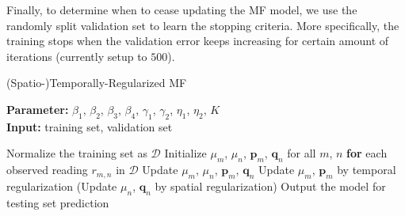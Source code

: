 Finally, to determine when to cease updating the MF model, we use the randomly split validation set to learn the stopping criteria. More specifically, the training stops when the validation error keeps increasing for certain amount of iterations (currently setup to $500$). 

\begin{algorithm}
	\caption{(Spatio-)Temporally-Regularized MF}
	\label{alg:STRMF}
	\textbf{Parameter:} $\beta_1$, $\beta_2$, $\beta_3$, $\beta_4$, $\gamma_1$, $\gamma_2$, $\eta_1$, $\eta_2$, $K$\\
	\textbf{Input:} training set, validation set
	\begin{algorithmic}
		\State Normalize the training set as $\mathcal{D}$
		\State Initialize $\mu_m$, $\mu_n$, $\mathbf{p}_m$, $\mathbf{q}_n$ for all $m$, $n$
		\Repeat
			\State \textbf{for} each observed reading $r_{m,n}$ in $\mathcal{D}$
				\State \indent Update $\mu_m$, $\mu_n$, $\mathbf{p}_{m}$, $\mathbf{q}_{n}$
			\State Update $\mu_m$, $\mathbf{p}_m$ by temporal regularization
			\State (Update $\mu_n$, $\mathbf{q}_n$ by spatial regularization)
		\State Output the model for testing set prediction
	\end{algorithmic}
\end{algorithm}
